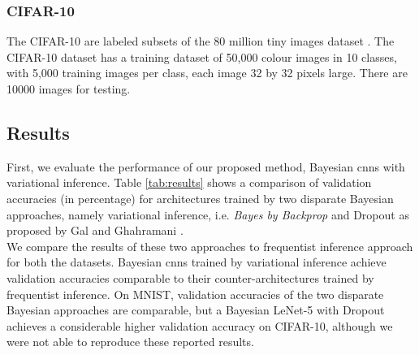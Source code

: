 \subsubsection{CIFAR-10}
The CIFAR-10 are labeled subsets of the 80 million tiny images dataset \cite{Torralba:2008:MTI:1444381.1444403}. The CIFAR-10 dataset has a training dataset of 50,000 colour images in 10 classes, with 5,000 training images per class, each image 32 by 32 pixels large. There are 10000 images for testing. 
\newline

\subsection{Results}
First, we evaluate the performance of our proposed method, Bayesian \acp{cnn} with variational inference. Table \ref{tab:results} shows a comparison of validation accuracies (in percentage) for architectures trained by two disparate Bayesian approaches, namely variational inference, i.e. \textit{Bayes by Backprop} and Dropout as proposed by Gal and Ghahramani \cite{gal2015bayesian}.\\

We compare the results of these two approaches to frequentist inference approach for both the datasets. Bayesian \acp{cnn} trained by variational inference achieve validation accuracies comparable to their counter-architectures trained by frequentist inference. On MNIST, validation accuracies of the two disparate Bayesian approaches are comparable, but a Bayesian LeNet-5 with Dropout achieves a considerable higher validation accuracy on CIFAR-10, although we were not able to reproduce these reported results.
\begin{table}[H]
\tiny
    \centering
    \renewcommand{\arraystretch}{1.5}
    \renewcommand{\arraystretch}{1.5}
    \caption{Comparison of validation accuracies (in percentage) for different architectures with variational inference (VI), frequentist inference and Dropout as a Bayesian approximation as proposed by Gal and Ghahramani \cite{gal2015bayesian} for MNIST, and CIFAR-10.}
    \label{tab:results}
\end{table}

